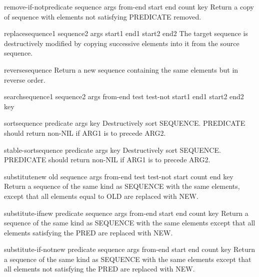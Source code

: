 \begin{function}{remove-if-not}{predicate sequence \rest args \key from-end start end count key}{}{}
  Return a copy of sequence with elements not satisfying PREDICATE removed.
\end{function}

\begin{function}{replace}{sequence1 sequence2 \rest args \key start1 end1 start2 end2}{}{}
  The target sequence is destructively modified by copying successive
   elements into it from the source sequence.
\end{function}

\begin{function}{reverse}{sequence}{}{}
  Return a new sequence containing the same elements but in reverse order.
\end{function}

\begin{function}{search}{sequence1 sequence2 \rest args \key from-end test test-not start1 end1 start2
 end2 key}{}{}
  
\end{function}

\begin{function}{sort}{sequence predicate \rest args \key key}{}{}
  Destructively sort SEQUENCE. PREDICATE should return non-NIL if
   ARG1 is to precede ARG2.
\end{function}

\begin{function}{stable-sort}{sequence predicate \rest args \key key}{}{}
  Destructively sort SEQUENCE. PREDICATE should return non-NIL if
   ARG1 is to precede ARG2.
\end{function}

\begin{function}{substitute}{new old sequence \rest args \key from-end test test-not start count end key}{}{}
  Return a sequence of the same kind as SEQUENCE with the same elements,
  except that all elements equal to OLD are replaced with NEW.
\end{function}

\begin{function}{substitute-if}{new predicate sequence \rest args \key from-end start end count key}{}{}
  Return a sequence of the same kind as SEQUENCE with the same elements
  except that all elements satisfying the PRED are replaced with NEW.
\end{function}

\begin{function}{substitute-if-not}{new predicate sequence \rest args \key from-end start end count key}{}{}
  Return a sequence of the same kind as SEQUENCE with the same elements
  except that all elements not satisfying the PRED are replaced with NEW.
\end{function}

